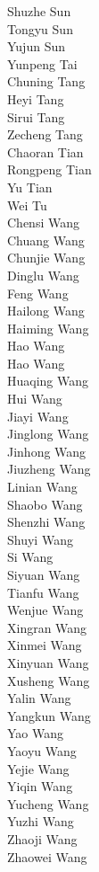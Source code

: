 Shuzhe Sun\\
Tongyu Sun\\
Yujun Sun\\
Yunpeng Tai\\
Chuning Tang\\
Heyi Tang\\
Sirui Tang\\
Zecheng Tang\\
Chaoran Tian\\
Rongpeng Tian\\
Yu Tian\\
Wei Tu\\
Chensi Wang\\
Chuang Wang\\
Chunjie Wang\\
Dinglu Wang\\
Feng Wang\\
Hailong Wang\\
Haiming Wang\\
Hao Wang\\
Hao Wang\\
Huaqing Wang\\
Hui Wang\\
Jiayi Wang\\
Jinglong Wang\\
Jinhong Wang\\
Jiuzheng Wang\\
Linian Wang\\
Shaobo Wang\\
Shenzhi Wang\\
Shuyi Wang\\
Si Wang\\
Siyuan Wang\\
Tianfu Wang\\
Wenjue Wang\\
Xingran Wang\\
Xinmei Wang\\
Xinyuan Wang\\
Xusheng Wang\\
Yalin Wang\\
Yangkun Wang\\
Yao Wang\\
Yaoyu Wang\\
Yejie Wang\\
Yiqin Wang\\
Yucheng Wang\\
Yuzhi Wang\\
Zhaoji Wang\\
Zhaowei Wang\\
